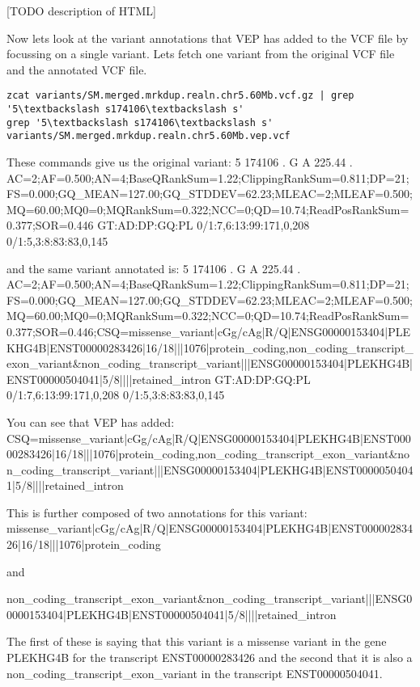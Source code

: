 [TODO description of HTML]

\begin{steps}
Now lets look at the variant annotations that VEP has added to the VCF file by focussing on a single variant. Lets fetch one variant from the original VCF file and the annotated VCF file.
\begin{lstlisting}
zcat variants/SM.merged.mrkdup.realn.chr5.60Mb.vcf.gz | grep '5\textbackslash s174106\textbackslash s'
grep '5\textbackslash s174106\textbackslash s' variants/SM.merged.mrkdup.realn.chr5.60Mb.vep.vcf
\end{lstlisting}
\end{steps}

These commands give us the original variant:
5	174106	.	G	A	225.44	.	AC=2;AF=0.500;AN=4;BaseQRankSum=1.22;ClippingRankSum=0.811;DP=21;FS=0.000;GQ\_MEAN=127.00;GQ\_STDDEV=62.23;MLEAC=2;MLEAF=0.500;MQ=60.00;MQ0=0;MQRankSum=0.322;NCC=0;QD=10.74;ReadPosRankSum=0.377;SOR=0.446	GT:AD:DP:GQ:PL	0/1:7,6:13:99:171,0,208	0/1:5,3:8:83:83,0,145

and the same variant annotated is:
5	174106	.	G	A	225.44	.	AC=2;AF=0.500;AN=4;BaseQRankSum=1.22;ClippingRankSum=0.811;DP=21;FS=0.000;GQ\_MEAN=127.00;GQ\_STDDEV=62.23;MLEAC=2;MLEAF=0.500;MQ=60.00;MQ0=0;MQRankSum=0.322;NCC=0;QD=10.74;ReadPosRankSum=0.377;SOR=0.446;CSQ=missense\_variant|cGg/cAg|R/Q|ENSG00000153404|PLEKHG4B|ENST00000283426|16/18|||1076|protein\_coding,non\_coding\_transcript\_exon\_variant\&non\_coding\_transcript\_variant|||ENSG00000153404|PLEKHG4B|ENST00000504041|5/8||||retained\_intron	GT:AD:DP:GQ:PL	0/1:7,6:13:99:171,0,208	0/1:5,3:8:83:83,0,145

You can see that VEP has added:
CSQ=missense\_variant|cGg/cAg|R/Q|ENSG00000153404|PLEKHG4B|ENST00000283426|16/18|||1076|protein\_coding,non\_coding\_transcript\_exon\_variant\&non\_coding\_transcript\_variant|||ENSG00000153404|PLEKHG4B|ENST00000504041|5/8||||retained\_intron

This is further composed of two annotations for this variant:
missense\_variant|cGg/cAg|R/Q|ENSG00000153404|PLEKHG4B|ENST00000283426|16/18|||1076|protein\_coding

and

non\_coding\_transcript\_exon\_variant\&non\_coding\_transcript\_variant|||ENSG00000153404|PLEKHG4B|ENST00000504041|5/8||||retained\_intron

The first of these is saying that this variant is a missense variant in the gene PLEKHG4B for the transcript ENST00000283426 and the second that it is also a non\_coding\_transcript\_exon\_variant in the transcript ENST00000504041.

